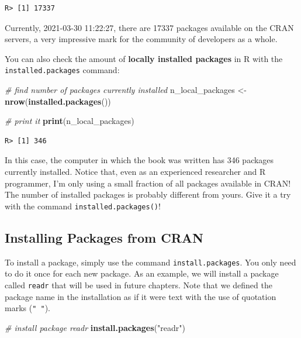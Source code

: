 \documentclass[
  12pt,
]{book}
\newenvironment{Shaded}{\begin{snugshade}}{\end{snugshade}}
\newcommand{\CommentTok}[1]{\textcolor[rgb]{0.37,0.37,0.37}{\textit{#1}}}
\newcommand{\KeywordTok}[1]{\textcolor[rgb]{0.27,0.27,0.27}{\textbf{#1}}}
\newcommand{\NormalTok}[1]{#1}
\newcommand{\StringTok}[1]{\textcolor[rgb]{0.5,0.5,0.5}{#1}}
\begin{document}
\begin{verbatim}
R> [1] 17337
\end{verbatim}

Currently, 2021-03-30 11:22:27, there are 17337 packages available on the CRAN servers, a very impressive mark for the community of developers as a whole.

You can also check the amount of \textbf{locally installed packages} in R with the \texttt{installed.packages} command: 

\begin{Shaded}
\begin{Highlighting}[]
\CommentTok{# find number of packages currently installed}
\NormalTok{n_local_packages <-}\StringTok{ }\KeywordTok{nrow}\NormalTok{(}\KeywordTok{installed.packages}\NormalTok{())}

\CommentTok{# print it}
\KeywordTok{print}\NormalTok{(n_local_packages)}
\end{Highlighting}
\end{Shaded}

\begin{verbatim}
R> [1] 346
\end{verbatim}

In this case, the computer in which the book was written has 346 packages currently installed. Notice that, even as an experienced researcher and R programmer, I'm only using a small fraction of all packages available in CRAN! The number of installed packages is probably different from yours. Give it a try with the command \texttt{installed.packages()}!

\hypertarget{installing-packages-from-cran}{%
\subsection{Installing Packages from CRAN}\label{installing-packages-from-cran}}

To install a package, simply use the command \texttt{install.packages}. You only need to do it once for each new package. As an example, we will install a package called \texttt{readr} that will be used in future chapters. Note that we defined the package name in the installation as if it were text with the use of quotation marks (\texttt{"\ "}). 

\begin{Shaded}
\begin{Highlighting}[]
\CommentTok{# install package readr}
\KeywordTok{install.packages}\NormalTok{(}\StringTok{"readr"}\NormalTok{)}
\end{Highlighting}
\end{Shaded}
\end{document}
